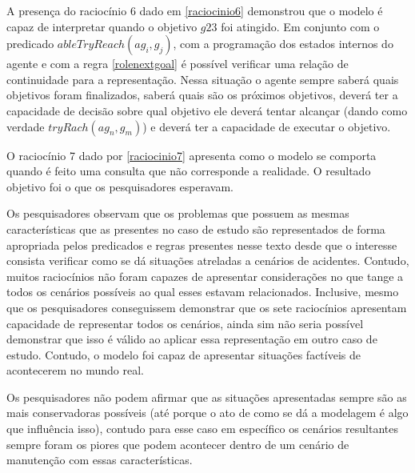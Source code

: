 A presença do raciocínio 6 dado em \ref{raciocinio6} demonstrou que o modelo é capaz de interpretar quando o objetivo $g23$ foi atingido. Em 
conjunto com o predicado $ableTryReach(ag_i,g_j)$, com a programação dos estados internos do agente e com a regra \ref{rolenextgoal} é possível 
verificar uma relação de continuidade para a representação. Nessa situação o agente sempre saberá quais objetivos foram finalizados, saberá 
quais são os próximos objetivos, deverá ter a capacidade de decisão sobre qual objetivo ele deverá tentar alcançar 
(dando como verdade $tryRach(ag_n,g_m)$) e deverá ter a capacidade de executar o objetivo. 

O raciocínio 7 dado por \ref{raciocinio7} apresenta como o modelo se comporta quando é feito uma consulta que não corresponde a realidade. O resultado objetivo foi o que os pesquisadores esperavam. 

Os pesquisadores observam que os problemas que possuem as mesmas características que as presentes no caso de estudo são representados de forma apropriada
pelos predicados e regras presentes nesse texto desde que o interesse consista verificar como se dá situações atreladas a cenários de acidentes. Contudo, 
muitos raciocínios não foram capazes de apresentar considerações no que tange a todos os cenários possíveis ao qual esses estavam relacionados. Inclusive, 
mesmo que os pesquisadores conseguissem demonstrar que os sete raciocínios apresentam capacidade de representar todos os cenários, ainda sim não seria 
possível demonstrar que isso é válido ao aplicar essa representação em outro caso de estudo. Contudo, o modelo foi capaz de apresentar situações factíveis 
de acontecerem no mundo real. 

Os pesquisadores não podem afirmar que as situações apresentadas sempre são as mais conservadoras possíveis (até porque o ato de como se dá a modelagem é algo que influência isso), contudo para esse caso em específico os cenários resultantes sempre foram os piores que podem acontecer dentro de um cenário de manutenção com essas características. 